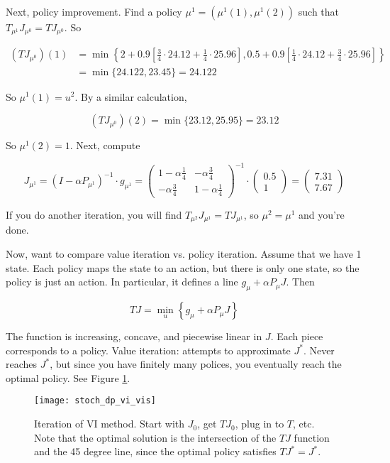 \begin{enumerate}
\begin{example}
Next, policy improvement. Find a policy \(\mu^1 = (\mu^1(1), \mu^1(2))\) such that \(T_{\mu^1} J_{\mu^0} = T J_{\mu^0}\). So

\begin{align*}
(TJ_{\mu^0})(1)  & = \min \left\{2 + 0.9 \left[ \frac{3}{4} \cdot 24.12 + \frac{1}{4} \cdot 25.96\right] , 0.5 + 0.9 \left[   \frac{1}{4} \cdot 24.12 + \frac{3}{4} \cdot 25.96\right]  \right\}
\\ & = \min\{24.122, 23.45\} = 24.122
\end{align*}

So \(\mu^1(1) = u^2\). By a similar calculation,

\[
(TJ_{\mu^0})(2) = \min\{23.12,  25.95\} = 23.12
\]

So \(\mu^1(2) = 1\). Next, compute

\[
J_{\mu^1} = (I - \alpha P_{\mu^1})^{-1} \cdot g_{\mu^1} = \begin{pmatrix}  1 - \alpha \frac{1}{4} & - \alpha \frac{3}{4} \\
- \alpha \frac{3}{4} & 1 - \alpha \frac{1}{4} \end{pmatrix}^{-1} \cdot \begin{pmatrix} 0.5 \\ 1 \end{pmatrix} = \begin{pmatrix} 7.31 \\ 7.67 \end{pmatrix}
\]

If you do another iteration, you will find \(T_{\mu^2} J_{\mu^1} = T J_{\mu^1}\), so \(\mu^2 = \mu^1\) and you're done.

\end{example}

Now, want to compare value iteration vs. policy iteration. Assume that we have 1 state. Each policy maps the state to an action, but there is only one state, so the policy is just an action. In particular, it defines a line \(g_\mu + \alpha P_\mu J\). Then

\[
TJ = \min_u \left\{g_\mu + \alpha P_\mu J \right\}
\]

The function is increasing, concave, and piecewise linear in \(J\). Each piece corresponds to a policy. Value iteration: attempts to approximate \(J^*\). Never reaches \(J^*\), but since you have finitely many polices, you eventually reach the optimal policy. See Figure \ref{stoch_dp_vi_vis_fig}. 

\begin{figure}[htbp]
\begin{center}
\texttt{[image: stoch\_dp\_vi\_vis]}
\caption{Iteration of VI method. Start with \(J_0\), get \(T J_0\), plug in to \(T\), etc. Note that the optimal solution is the intersection of the \(TJ\) function and the 45 degree line, since the optimal policy satisfies \(TJ^* = J^*\).}
\label{stoch_dp_vi_vis_fig}
\end{center}
\end{figure}


\end{enumerate}
